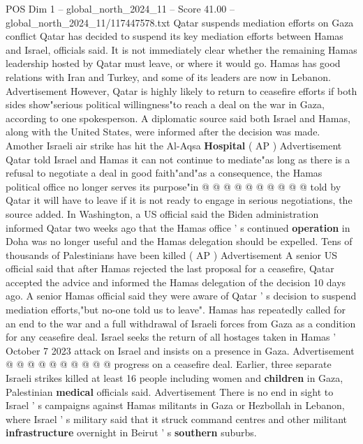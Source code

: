 \begin{textsample}{POS Dim 1 – global\_north\_2024\_11 – Score 41.00 – global\_north\_2024\_11/117447578.txt}  \label{ex:f1_pos_331}
Qatar suspends mediation efforts on Gaza conflict Qatar has decided to suspend its key mediation efforts between Hamas and Israel, officials said.
It is not immediately clear whether the remaining Hamas leadership hosted by Qatar must leave, or where it would go.
Hamas has good relations with Iran and Turkey, and some of its leaders are now in Lebanon.
Advertisement However, Qatar is highly likely to return to ceasefire efforts if both sides show"serious political willingness"to reach a deal on the war in Gaza, according to one spokesperson.
A diplomatic source said both Israel and Hamas, along with the United States, were informed after the decision was made.
Amother Israeli air strike has hit the Al-Aqsa \textbf{Hospital} ( AP ) Advertisement Qatar told Israel and Hamas it can not continue to mediate"as long as there is a refusal to negotiate a deal in good faith"and"as a consequence, the Hamas political office no longer serves its purpose"in @ @ @ @ @ @ @ @ @ @ told by Qatar it will have to leave if it is not ready to engage in serious negotiations, the source added.
In Washington, a US official said the Biden administration informed Qatar two weeks ago that the Hamas office ' s continued \textbf{operation} in Doha was no longer useful and the Hamas delegation should be expelled.
Tens of thousands of Palestinians have been killed ( AP ) Advertisement A senior US official said that after Hamas rejected the last proposal for a ceasefire, Qatar accepted the advice and informed the Hamas delegation of the decision 10 days ago.
A senior Hamas official said they were aware of Qatar ' s decision to suspend mediation efforts,"but no-one told us to leave".
Hamas has repeatedly called for an end to the war and a full withdrawal of Israeli forces from Gaza as a condition for any ceasefire deal.
Israel seeks the return of all hostages taken in Hamas ' October 7 2023 attack on Israel and insists on a presence in Gaza.
Advertisement @ @ @ @ @ @ @ @ @ @ progress on a ceasefire deal.
Earlier, three separate Israeli strikes killed at least 16 people including women and \textbf{children} in Gaza, Palestinian \textbf{medical} officials said.
Advertisement There is no end in sight to Israel ' s campaigns against Hamas militants in Gaza or Hezbollah in Lebanon, where Israel ' s military said that it struck command centres and other militant \textbf{infrastructure} overnight in Beirut ' s \textbf{southern} suburbs.

\end{textsample}
